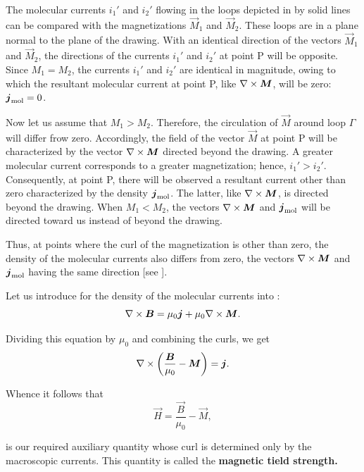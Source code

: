 The molecular currents $i_1'$ and $i_2'$ flowing
in the loops depicted in  by solid lines can be compared with the magnetizations $\vec{M}_1$ and $\vec{M}_2$.
These loops are in a plane normal to the plane of the drawing.
With an identical direction of the vectors $\vec{M}_1$ and $\vec{M}_2$, the directions of the currents $i_1'$ and $i_2'$ at point P will be opposite.
Since $M_1=M_2$, the currents $i_1'$ and $i_2'$ are identical in magnitude, owing to which the resultant molecular current at point P, like $\nabla\times\boldsymbol{M}$, will be zero: $\boldsymbol{j}_{\text{mol}}=0$.

Now let us assume that $M_1>M_2$.
Therefore, the circulation of $\vec{M}$ around loop $\Gamma$ will differ frow zero.
Accordingly, the field of the vector $\vec{M}$ at point P will be characterized by the vector $\nabla\times\boldsymbol{M}$ directed beyond the drawing.
A greater molecular current corresponds to a greater magnetization; hence, $i_1'>i_2'$.
Consequently, at point P, there will be observed a resultant current other than zero characterized by the density $\boldsymbol{j}_{\text{mol}}$.
The latter, like $\nabla\times\boldsymbol{M}$, is directed beyond the drawing.
When $M_1<M_2$, the vectors $\nabla\times\boldsymbol{M}$ and $\boldsymbol{j}_{\text{mol}}$ will be directed toward us instead of beyond the drawing.

Thus, at points where the curl of the magnetization is other than zero, the density of the molecular currents also differs from zero, the vectors $\nabla\times\boldsymbol{M}$ and $\boldsymbol{j}_{\text{mol}}$ having the same direction [see ].

Let us introduce  for the density of the molecular currents into :
\begin{equation*}
    \nabla\times\boldsymbol{B} = \mu_0 \boldsymbol{j} + \mu_0 \nabla\times\boldsymbol{M}.
\end{equation*}

\noindent
Dividing this equation by $\mu_0$ and combining the curls, we get
\begin{equation}\label{eq:7_7}
    \nabla\times\left(\frac{\boldsymbol{B}}{\mu_0} - \boldsymbol{M}\right) = \boldsymbol{j}.
\end{equation}

\noindent
Whence it follows that
\begin{equation}\label{eq:7_8}
    \vec{H} = \frac{\vec{B}}{\mu_0} - \vec{M},
\end{equation}

\noindent
is our required auxiliary quantity whose curl is determined only by the macroscopic currents.
This quantity is called the \textbf{magnetic tield strength.}

